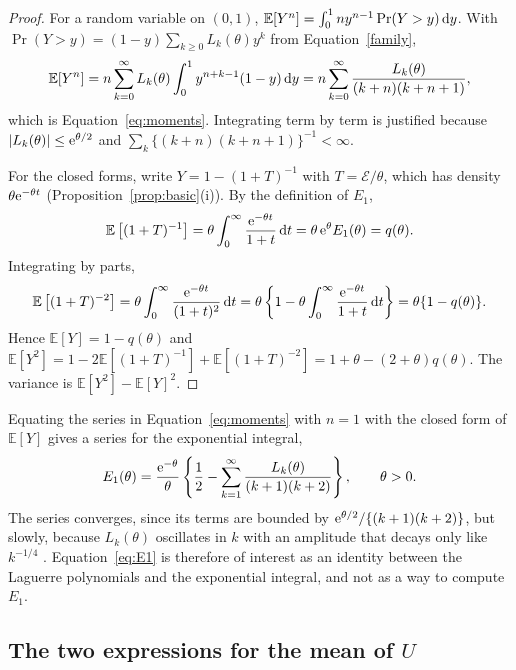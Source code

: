 \documentclass[12pt]{article}
\newcommand{\E}{\mathbb{E}}       %
\newcommand{\e}{{\rm e}}         %
\newcommand{\dd}{{\rm d}}        %
\newcommand{\Exp}{\mathcal{E}}   %
\begin{document}
\begin{proof}
For a random variable on $(0,1)$, $\E[Y^n]=\int_0^1 n y^{n-1}\Pr(Y>y)\,\dd y$. With $\Pr(Y>y)=(1-y)\sum_{k\geq0}L_k(\theta)y^k$ from Equation~\eqref{family},
\[
\E[Y^n]=n\sum_{k=0}^{\infty}L_k(\theta)\int_0^1 y^{n+k-1}(1-y)\,\dd y=n\sum_{k=0}^{\infty}\frac{L_k(\theta)}{(k+n)(k+n+1)},
\]
which is Equation~\eqref{eq:moments}. Integrating term by term is justified because $|L_k(\theta)|\leq\e^{\theta/2}$ and $\sum_k\{(k+n)(k+n+1)\}^{-1}<\infty$.

For the closed forms, write $Y=1-(1+T)^{-1}$ with $T=\Exp/\theta$, which has density $\theta\e^{-\theta t}$ (Proposition~\ref{prop:basic}(i)). By the definition of $E_1$,
\[
\E\left[(1+T)^{-1}\right]=\theta\int_0^\infty\frac{\e^{-\theta t}}{1+t}\,\dd t=\theta\,\e^{\theta}E_1(\theta)=q(\theta).
\]
Integrating by parts,
\[
\E\left[(1+T)^{-2}\right]=\theta\int_0^\infty\frac{\e^{-\theta t}}{(1+t)^2}\,\dd t=\theta\left\{1-\theta\int_0^\infty\frac{\e^{-\theta t}}{1+t}\,\dd t\right\}=\theta\{1-q(\theta)\}.
\]
Hence $\E[Y]=1-q(\theta)$ and $\E[Y^2]=1-2\E[(1+T)^{-1}]+\E[(1+T)^{-2}]=1+\theta-(2+\theta)q(\theta)$. The variance is $\E[Y^2]-\E[Y]^2$.
\end{proof}

Equating the series in Equation~\eqref{eq:moments} with $n=1$ with the closed form of $\E[Y]$ gives a series for the exponential integral,
\begin{equation}\label{eq:E1}
E_1(\theta)=\frac{\e^{-\theta}}{\theta}\left\{\frac12 - \sum_{k=1}^{\infty} \frac{L_k(\theta)}{(k+1)(k+2)}\right\}, \qquad \theta>0.
\end{equation}
The series converges, since its terms are bounded by $\e^{\theta/2}/\{(k+1)(k+2)\}$, but slowly, because $L_k(\theta)$ oscillates in $k$ with an amplitude that decays only like $k^{-1/4}$ \citep[Section~8.22]{szeg1939orthogonal}. Equation~\eqref{eq:E1} is therefore of interest as an identity between the Laguerre polynomials and the exponential integral, and not as a way to compute $E_1$.

\subsection{The two expressions for the mean of $U$}\label{app:EU}
\end{document}
